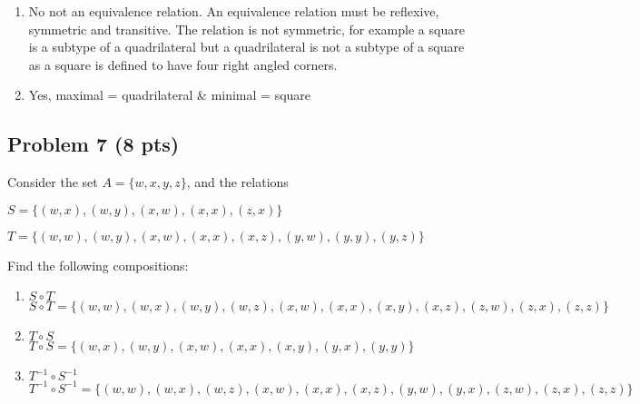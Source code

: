 \documentclass[12pt]{article}
\begin{document}
\begin{enumerate}

\item No not an equivalence relation. An equivalence relation must be reflexive, symmetric and transitive. The relation is not symmetric, for example a square is a subtype of a quadrilateral
but a quadrilateral is not a subtype of a square as a square is defined to have four right angled corners.

\item Yes, maximal = quadrilateral \& minimal = square
\end{enumerate}


\newpage

\subsection{Problem 7 (8 pts)}

Consider the set $A = \{ w, x, y, z \}$, and the relations

\begin{description}

\item $S = \{ (w, x), (w, y), (x, w), (x, x), (z, x) \}$

\item $T = \{ (w, w), (w, y), (x, w), (x, x),  (x, z), (y, w), (y, y), (y, z) \}$
\end{description}

\noindent Find the following compositions:

\begin{enumerate}
\item $S \circ T$\\
$S \circ T = \{ (w, w), (w, x), (w, y), (w, z), (x, w), (x, x), (x, y), (x, z), (z, w), (z, x), (z, z) \}$\\

\item $T \circ S$\\
$T \circ S = \{ (w, x), (w, y), (x, w), (x, x), (x, y), (y, x) , (y, y) \}$\\

\item $T^{-1} \circ S^{-1}$\\
$T^{-1} \circ S^{-1} = \{ (w, w), (w, x), (w, z), (x, w), (x, x), (x, z), (y, w), (y, x), (z, w), (z, x), (z, z) \}$\\
\end{enumerate}
\end{document}
